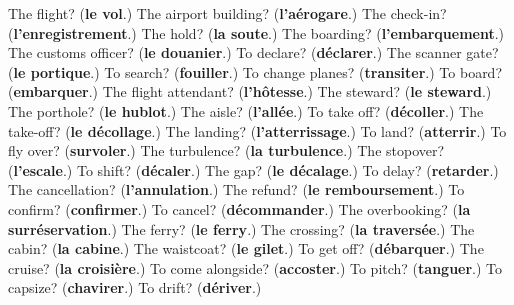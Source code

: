 \begin{tcolorbox}[breakable,colback=teal!4,colframe=teal!35!black,title={Before you move on}]
The flight? (\textbf{le vol}.) The airport building? (\textbf{l'aérogare}.) The check-in? (\textbf{l'enregistrement}.) The hold? (\textbf{la soute}.) The boarding? (\textbf{l'embarquement}.) The customs officer? (\textbf{le douanier}.) To declare? (\textbf{déclarer}.) The scanner gate? (\textbf{le portique}.) To search? (\textbf{fouiller}.) To change planes? (\textbf{transiter}.) To board? (\textbf{embarquer}.) The flight attendant? (\textbf{l'hôtesse}.) The steward? (\textbf{le steward}.) The porthole? (\textbf{le hublot}.) The aisle? (\textbf{l'allée}.) To take off? (\textbf{décoller}.) The take-off? (\textbf{le décollage}.) The landing? (\textbf{l'atterrissage}.) To land? (\textbf{atterrir}.) To fly over? (\textbf{survoler}.) The turbulence? (\textbf{la turbulence}.) The stopover? (\textbf{l'escale}.) To shift? (\textbf{décaler}.) The gap? (\textbf{le décalage}.) To delay? (\textbf{retarder}.) The cancellation? (\textbf{l'annulation}.) The refund? (\textbf{le remboursement}.) To confirm? (\textbf{confirmer}.) To cancel? (\textbf{décommander}.) The overbooking? (\textbf{la surréservation}.) The ferry? (\textbf{le ferry}.) The crossing? (\textbf{la traversée}.) The cabin? (\textbf{la cabine}.) The waistcoat? (\textbf{le gilet}.) To get off? (\textbf{débarquer}.) The cruise? (\textbf{la croisière}.) To come alongside? (\textbf{accoster}.) To pitch? (\textbf{tanguer}.) To capsize? (\textbf{chavirer}.) To drift? (\textbf{dériver}.)
\end{tcolorbox}
